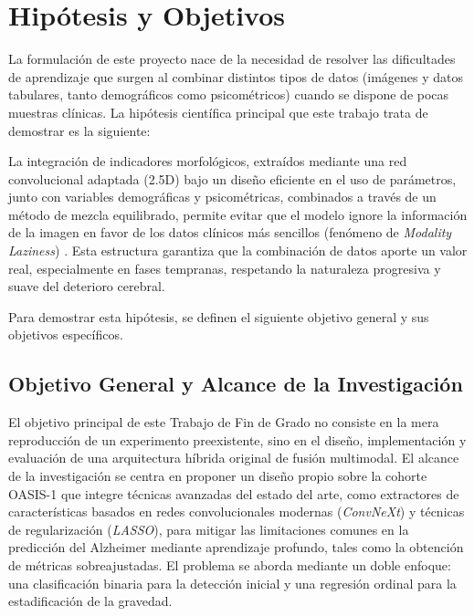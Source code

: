 \documentclass[12pt, oneside, english, spanish]{book}
\begin{document}
\section{Hipótesis y Objetivos} \label{sec:hipotesis_objetivos}
La formulación de este proyecto nace de la necesidad de resolver las dificultades de aprendizaje que surgen al combinar distintos tipos de datos (imágenes y datos tabulares, tanto demográficos como psicométricos) cuando se dispone de pocas muestras clínicas. La hipótesis científica principal que este trabajo trata de demostrar es la siguiente:

La integración de indicadores morfológicos, extraídos mediante una red convolucional adaptada (2.5D) bajo un diseño eficiente en el uso de parámetros, junto con variables demográficas y psicométricas, combinados a través de un método de mezcla equilibrado, permite evitar que el modelo ignore la información de la imagen en favor de los datos clínicos más sencillos (fenómeno de \textit{Modality Laziness}) \cite{javaloy2022, wang2020makes}. Esta estructura garantiza que la combinación de datos aporte un valor real, especialmente en fases tempranas, respetando la naturaleza progresiva y suave del deterioro cerebral.

Para demostrar esta hipótesis, se definen el siguiente objetivo general y sus objetivos específicos.

\subsection{Objetivo General y Alcance de la Investigación} \label{subsec:objetivo_general}

El objetivo principal de este Trabajo de Fin de Grado no consiste en la mera reproducción de un experimento preexistente, sino en el diseño, implementación y evaluación de una arquitectura híbrida original de fusión multimodal. El alcance de la investigación se centra en proponer un diseño propio sobre la cohorte OASIS-1 \cite{marcus2007oasis} que integre técnicas avanzadas del estado del arte, como extractores de características basados en redes convolucionales modernas (\textit{ConvNeXt}) y técnicas de regularización (\textit{LASSO}), para mitigar las limitaciones comunes en la predicción del Alzheimer mediante aprendizaje profundo, tales como la obtención de métricas sobreajustadas. El problema se aborda mediante un doble enfoque: una clasificación binaria para la detección inicial y una regresión ordinal para la estadificación de la gravedad.
\end{document}
